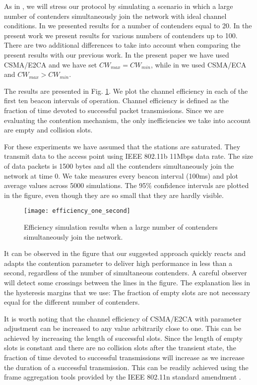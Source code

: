 \documentclass[journal]{IEEEtran}
\begin{document}
As in \cite{barcelo2010dpa}, we will stress our protocol by simulating a scenario in which a large number of contenders simultaneously join the network with ideal channel conditions. In \cite{barcelo2010dpa} we presented results for a number of contenders equal to 20. In the present work we present results for various numbers of contenders up to 100. There are two additional differences to take into account when comparing the present results with our previous work. In the present paper we have used CSMA/E2CA and we have set $CW_{max}=CW_{min}$, while in \cite{barcelo2010dpa} we used CSMA/ECA and $CW_{max} > CW_{min}$.

The results are presented in Fig. \ref{fig:efficiency_one_second}. We plot the channel efficiency in each of the first ten beacon intervals of operation. Channel efficiency is defined as the fraction of time devoted to successful packet transmissions. Since we are evaluating the contention mechanism, the only inefficiencies we take into account are empty and collision slots. 

For these experiments we have assumed that the stations are saturated. They transmit data to the access point using IEEE 802.11b 11Mbps data rate. The size of data packets is 1500 bytes and all the contenders simultaneously join the network at time 0. We take measures every beacon interval (100ms) and plot average values across 5000 simulations. The 95\% confidence intervals are plotted in the figure, even though they are so small that they are hardly visible.

\begin{figure}[!t]
\centering
\texttt{[image: efficiency\_one\_second]}
\caption{Efficiency simulation results when a large number of contenders simultaneously join the network.}
\label{fig:efficiency_one_second}
\end{figure}

It can be observed in the figure that our suggested approach quickly reacts and adapts the contention parameter to deliver high performance in less than a second, regardless of the number of simultaneous contenders. A careful observer will detect some crossings between the lines in the figure. The explanation lies in the hysteresis margins that we use: The fraction of empty slots are not necessary equal for the different number of contenders.

It is worth noting that the channel efficiency of CSMA/E2CA with parameter adjustment can be increased to any value arbitrarily close to one. This can be achieved by increasing the length of successful slots. Since the length of empty slots is constant and there are no collision slots after the transient state, the fraction of time devoted to successful transmissions will increase as we increase the duration of a successful transmission. This can be readily achieved using the frame aggregation tools provided by the IEEE 802.11n standard amendment \cite{IEEE80211n-IEEESTD2009}.
\end{document}
